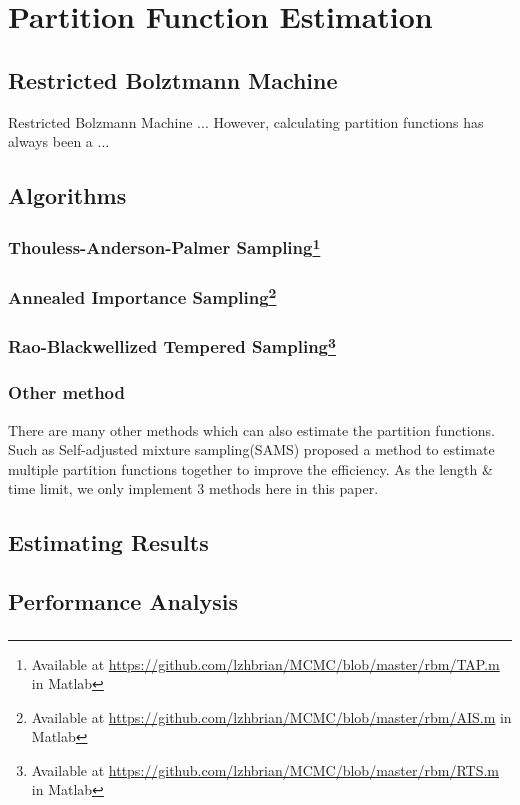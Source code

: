 
\section{Partition Function Estimation} \label{sec:rbm}



\subsection{Restricted Bolztmann Machine}
Restricted Bolzmann Machine ...
However, calculating partition functions has always been a ...



\subsection{Algorithms}

\subsubsection{Thouless-Anderson-Palmer Sampling\protect\footnote{Available at \protect\url{https://github.com/lzhbrian/MCMC/blob/master/rbm/TAP.m} in Matlab}}



\subsubsection{Annealed Importance Sampling\protect\footnote{Available at \protect\url{https://github.com/lzhbrian/MCMC/blob/master/rbm/AIS.m} in Matlab}}
\subsubsection{Rao-Blackwellized Tempered Sampling\protect\footnote{Available at \protect\url{https://github.com/lzhbrian/MCMC/blob/master/rbm/RTS.m} in Matlab}}
\subsubsection{Other method}
There are many other methods which can also estimate the partition functions. Such as Self-adjusted mixture sampling(SAMS)\cite{tan2015optimally} proposed a method to estimate multiple partition functions together to improve the efficiency. As the length \& time limit, we only implement 3 methods here in this paper.


\subsection{Estimating Results}



\subsection{Performance Analysis}
\subsubsection{}



